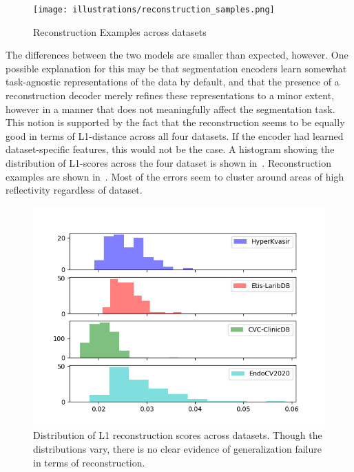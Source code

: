     \begin{figure}[htb]
        \centering
        \texttt{[image: illustrations/reconstruction\_samples.png]}
        \caption{Reconstruction Examples across datasets}
        \label{fig:reconstruction}
    \end{figure}

    The differences between the two models are smaller than expected, however. One possible explanation for this may be that segmentation encoders learn somewhat task-agnostic representations of the data by default, and that the presence of a reconstruction decoder merely refines these representations to a minor extent, however in a manner that does not meaningfully affect the segmentation task. This notion is supported by the fact that the reconstruction seems to be equally good in terms of L1-distance across all four datasets. If the encoder had learned dataset-specific features, this would not be the case. A histogram showing the distribution of L1-scores across the four dataset is shown in~. Reconstruction examples are shown in~. Most of the errors seem to cluster around areas of high reflectivity regardless of dataset.  
    
    \begin{figure}[htb]
        \centering
        \includegraphics[width=\linewidth]{illustrations/l1_reconstruction.png}
        \caption[L1 reconstruction distributions across datasets]{Distribution of L1 reconstruction scores across datasets. Though the distributions vary, there is no clear evidence of generalization failure in terms of reconstruction.}
        \label{fig:l1_rec}
    \end{figure}
    

